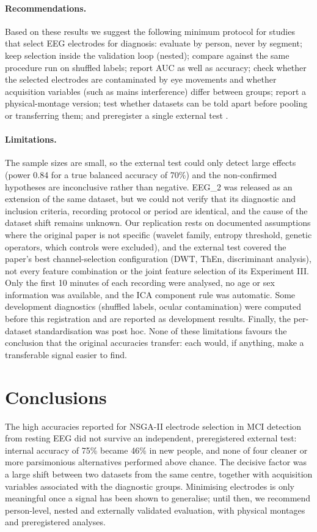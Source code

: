 \paragraph{Recommendations.} Based on these results we suggest the following minimum protocol for studies that select EEG electrodes for diagnosis: evaluate by person, never by segment; keep selection inside the validation loop (nested); compare against the same procedure run on shuffled labels; report AUC as well as accuracy; check whether the selected electrodes are contaminated by eye movements and whether acquisition variables (such as mains interference) differ between groups; report a physical-montage version; test whether datasets can be told apart before pooling or transferring them; and preregister a single external test \citep{nosek2018,collins2024}.

\paragraph{Limitations.} The sample sizes are small, so the external test could only detect large effects (power 0.84 for a true balanced accuracy of 70\%) and the non-confirmed hypotheses are inconclusive rather than negative. EEG\_2 was released as an extension of the same dataset, but we could not verify that its diagnostic and inclusion criteria, recording protocol or period are identical, and the cause of the dataset shift remains unknown. Our replication rests on documented assumptions where the original paper is not specific (wavelet family, entropy threshold, genetic operators, which controls were excluded), and the external test covered the paper's best channel-selection configuration (DWT, ThEn, discriminant analysis), not every feature combination or the joint feature selection of its Experiment III. Only the first 10 minutes of each recording were analysed, no age or sex information was available, and the ICA component rule was automatic. Some development diagnostics (shuffled labels, ocular contamination) were computed before this registration and are reported as development results. Finally, the per-dataset standardisation was post hoc. None of these limitations favours the conclusion that the original accuracies transfer: each would, if anything, make a transferable signal easier to find.

\section{Conclusions}

The high accuracies reported for NSGA-II electrode selection in MCI detection from resting EEG did not survive an independent, preregistered external test: internal accuracy of 75\% became 46\% in new people, and none of four cleaner or more parsimonious alternatives performed above chance. The decisive factor was a large shift between two datasets from the same centre, together with acquisition variables associated with the diagnostic groups. Minimising electrodes is only meaningful once a signal has been shown to generalise; until then, we recommend person-level, nested and externally validated evaluation, with physical montages and preregistered analyses.
